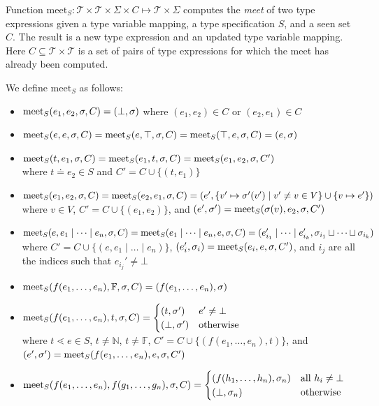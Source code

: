 \documentclass{amsart}
\begin{document}
Function $\mathrm{meet}_{S}: \mathcal{T} \times \mathcal{T} \times \Sigma \times C \mapsto \mathcal{T} \times \Sigma$
computes the \emph{meet} of two type expressions given a type variable mapping, a type specification $S$, and a seen set $C$.
The result is a new type expression and an updated type variable mapping.
Here $C \subseteq \mathcal{T} \times \mathcal{T}$ is a set of pairs of type expressions for which the meet has already been computed.

We define $\mathrm{meet}_{S}$ as follows:
\begin{itemize}
    \item $\mathrm{meet}_S(e_1, e_2, \sigma, C) = (\bot, \sigma)$ where $(e_1, e_2) \in C$ or $(e_2, e_1) \in C$
    \item $\mathrm{meet}_S(e,e,\sigma,C) = \mathrm{meet}_{S}(e, \top, \sigma, C) = \mathrm{meet}_{S}(\top, e, \sigma, C) = (e, \sigma)$
    \item $\mathrm{meet}_S(t, e_1, \sigma, C) = \mathrm{meet}_S(e_1, t, \sigma, C) = \mathrm{meet}_S(e_1,e_2,\sigma,C')$\\
        where $t \doteq e_2 \in S$ and $C' = C \cup \{(t, e_1)\}$
    \item $\mathrm{meet}_{S}(e_1, e_2, \sigma, C) = \mathrm{meet}_{S}(e_2, e_1, \sigma, C) = (e', \{v' \mapsto \sigma'(v') \mid v' \neq v \in V\} \cup \{v \mapsto e'\})$\\
        where $v \in V$, $C' = C \cup \{(e_1, e_2)\}$, and $(e', \sigma') = \mathrm{meet}_{S}(\sigma(v), e_2, \sigma, C')$
    \item $\mathrm{meet}_S(e, e_1 \mid \dots \mid e_n, \sigma, C) = \mathrm{meet}_S(e_1 \mid \dots \mid e_n, e, \sigma, C) = (e_{i_1}' \mid \dots \mid e_{i_k}', \sigma_{i_1} \sqcup \dots \sqcup \sigma_{i_k})$ \\
        where $C' = C \cup \{(e, e_1 \mid \dots \mid e_n)\}$, $(e_i',\sigma_i) = \mathrm{meet}_S(e_i,e,\sigma,C')$, and $i_j$ are all the indices such that $e_{i_j}' \neq \bot$
    \item $\mathrm{meet}_S(f(e_1,\dots,e_n),\mathbb{F},\sigma,C) = (f(e_1,\dots,e_n), \sigma)$
    \item $\mathrm{meet}_S(f(e_1,\dots,e_n),t,\sigma,C) = \begin{cases} (t,\sigma') & e' \neq \bot \\ (\bot,\sigma') & \text{otherwise} \end{cases}$\\
        where $t \lessdot e \in S$, $t \neq \mathbb{N}$, $t \neq \mathbb{F}$, $C' = C \cup \{(f(e_1,\dots,e_n), t)\}$, and $(e',\sigma') = \mathrm{meet}_S(f(e_1,\dots,e_n),e,\sigma,C')$
    \item $\mathrm{meet}_S(f(e_1,\dots,e_n),f(g_1,\dots,g_n), \sigma, C) = \begin{cases} (f(h_1,\dots,h_n),\sigma_n) & \text{all } h_i \neq \bot \\ (\bot,\sigma_n) & \text{otherwise} \end{cases}$

\end{itemize}
\end{document}
